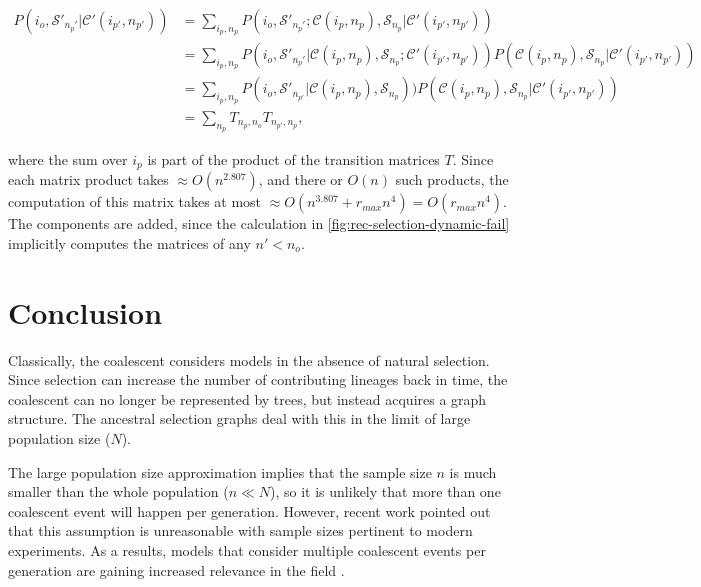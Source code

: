 \documentclass[review]{elsarticle}
\begin{document}
\begin{equation}
  \begin{split}
    P(i_o, \mathcal{S}'_{n_p'} | \mathcal{C}'(i_{p'}, n_{p'})) & = \sum_{i_p,n_p} P(i_o, \mathcal{S}'_{n_p'} ; \mathcal{C}(i_p,n_p), \mathcal{S}_{n_p} | \mathcal{C}'(i_{p'}, n_{p'}))\\
    &= \sum_{i_p,n_p}  P(i_o, \mathcal{S}'_{n_p'} | \mathcal{C}(i_p,n_p), \mathcal{S}_{n_p} ; \mathcal{C}'(i_{p'}, n_{p'})) P(\mathcal{C}(i_p,n_p), \mathcal{S}_{n_p} | \mathcal{C}'(i_{p'}, n_{p'})) \\
    &=  \sum_{i_p,n_p}  P(i_o, \mathcal{S}'_{n_{p'}} | \mathcal{C}(i_p,n_p), \mathcal{S}_{n_p})) P(\mathcal{C}(i_p,n_p), \mathcal{S}_{n_p} | \mathcal{C}'(i_{p'}, n_{p'})) \\
    &=   \sum_{n_p} T_{n_p,n_o} T_{n_{p'}, n_p},
  \end{split}
\end{equation}

where the sum over $i_p$ is part of the product of the transition matrices $T$. Since each matrix
product takes $\approx O(n^{2.807})$, and there or $O(n)$ such products, the computation of this
matrix takes at most $\approx O(n^{3.807} + r_{max}n^4) = O(r_{max}n^4)$. The components are added,
since the calculation in \ref{fig:rec-selection-dynamic-fail} implicitly computes the matrices of
any $n'<n_o$.

\section{Conclusion}
\label{sec:conclusion}

Classically, the coalescent considers models in the absence of natural selection. Since selection
can increase the number of contributing lineages back in time, the coalescent can no longer be
represented by trees, but instead acquires a graph structure. The ancestral selection graphs
\citep{KroneNeuhauser1997} deal with this in the limit of large population size ($N$).

The large population size approximation implies that the sample size $n$ is much smaller than the
whole population ($n \ll N$), so it is unlikely that more than one coalescent event will happen per
generation. However, recent work \citep{BhaskarEtAl2014,NelsonEtAl2019} pointed out that this
assumption is unreasonable with sample sizes pertinent to modern experiments. As a results, models
that consider multiple coalescent events per generation are gaining increased relevance in the field
\citep{DonnellyKurtz1999a}.
\end{document}
